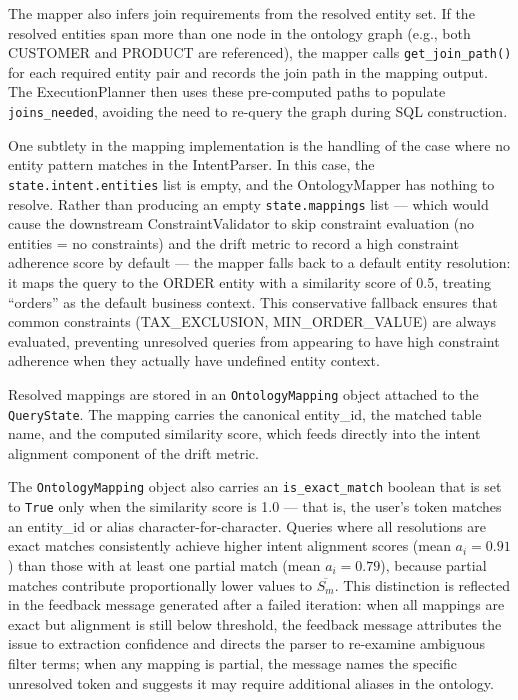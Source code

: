 \documentclass[12pt,a4paper]{report}
\begin{document}
The mapper also infers join requirements from the resolved entity set. If the resolved entities span more than one node in the ontology graph (e.g., both CUSTOMER and PRODUCT are referenced), the mapper calls \texttt{get\_join\_path()} for each required entity pair and records the join path in the mapping output. The ExecutionPlanner then uses these pre-computed paths to populate \texttt{joins\_needed}, avoiding the need to re-query the graph during SQL construction.

One subtlety in the mapping implementation is the handling of the case where no entity pattern matches in the IntentParser. In this case, the \texttt{state.intent.entities} list is empty, and the OntologyMapper has nothing to resolve. Rather than producing an empty \texttt{state.mappings} list — which would cause the downstream ConstraintValidator to skip constraint evaluation (no entities = no constraints) and the drift metric to record a high constraint adherence score by default — the mapper falls back to a default entity resolution: it maps the query to the ORDER entity with a similarity score of 0.5, treating ``orders'' as the default business context. This conservative fallback ensures that common constraints (TAX\_EXCLUSION, MIN\_ORDER\_VALUE) are always evaluated, preventing unresolved queries from appearing to have high constraint adherence when they actually have undefined entity context.

Resolved mappings are stored in an \texttt{OntologyMapping} object attached to the \texttt{QueryState}. The mapping carries the canonical entity\_id, the matched table name, and the computed similarity score, which feeds directly into the intent alignment component of the drift metric.

The \texttt{OntologyMapping} object also carries an \texttt{is\_exact\_match} boolean that is set to \texttt{True} only when the similarity score is 1.0 — that is, the user's token matches an entity\_id or alias character-for-character. Queries where all resolutions are exact matches consistently achieve higher intent alignment scores (mean $a_i = 0.91$) than those with at least one partial match (mean $a_i = 0.79$), because partial matches contribute proportionally lower values to $\overline{S_m}$. This distinction is reflected in the feedback message generated after a failed iteration: when all mappings are exact but alignment is still below threshold, the feedback message attributes the issue to extraction confidence and directs the parser to re-examine ambiguous filter terms; when any mapping is partial, the message names the specific unresolved token and suggests it may require additional aliases in the ontology.
\end{document}
